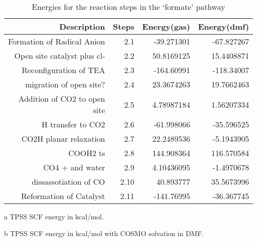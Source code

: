 \begin{table}[!htb]
\centering
 \begin{threeparttable}
  \caption{Energies for the reaction steps in the `formate' pathway}
    \begin{tabular}{rrrr}
    \toprule
    Description & Steps & Energy(gas)\tnote{a} & Energy(dmf)\tnote{b} \\
    \midrule
    Formation of Radical Anion & 2.1   & -39.271301 & -67.827267 \\
    Open site catalyst plus cl- & 2.2   & 50.8169125 & 15.4408871 \\
    Reconfiguration of TEA & 2.3   & -164.60991 & -118.34007 \\
    \midrule
    migration of open site? & 2.4   & 23.3674263 & 19.7662463 \\
    Addition of CO2 to open site & 2.5   & 4.78987184 & 1.56207334 \\
    H transfer to CO2 & 2.6   & -61.998066 & -35.596525 \\
    CO2H planar relaxation & 2.7   & 22.2489536 & -5.1943905 \\
    COOH2 ts & 2.8   & 144.908364 & 116.570584 \\
    CO4 + and water & 2.9   & 4.10436095 & -1.4970678 \\
    dissassotiation of CO & 2.10  & 40.893777 & 35.5673996 \\
    Reformation of Catalyst & 2.11  & -141.76995 & -36.367745 \\
    \bottomrule
    \end{tabular}%
    \begin{tablenotes}
    \item [a] TPSS SCF energy in kcal/mol.
    \item [b] TPSS SCF energy in kcal/mol with COSMO solvation in DMF.
    \end{tablenotes}
  \label{tab.wgsrxn}%
 \end{threeparttable}
\end{table}%


